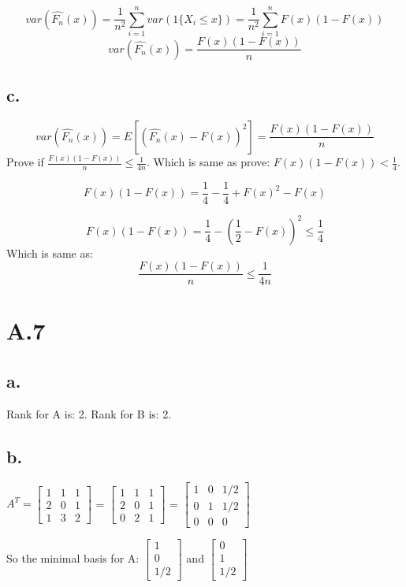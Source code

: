 \documentclass{article}
\begin{document}
\[var(\hat{F_n}(x))=\frac{1}{n^2}\sum_{i=1}^nvar(1\{X_i\le x\})=\frac{1}{n^2}\sum_{i=1}^nF(x)(1-F(x))\]
\[ var(\hat{F_n}(x))=\frac{F(x)(1-F(x))}{n}\]

\subsection{c.}

\[ var(\hat{F_n}(x))=E[(\hat{F_n}(x)-F(x))^2] =\frac{F(x)(1-F(x))}{n}\]
Prove if $\frac{F(x)(1-F(x))}{n}\le\frac{1}{4n}$.
Which is same as prove: $F(x)(1-F(x))<\frac{1}{4}$.\newline

\[ F(x)(1-F(x)) = \frac{1}{4}-\frac{1}{4}+F(x)^2-F(x) \]

\[ F(x)(1-F(x)) = \frac{1}{4}-(\frac{1}{2}-F(x))^2 \le \frac{1}{4}\]
Which is same as:
\[\frac{F(x)(1-F(x))}{n}\le\frac{1}{4n}\]



\section{A.7}
\subsection{a.}
Rank for A is: 2.\newline
Rank for B is: 2.
\subsection{b.}
$A^T=\begin{bmatrix}
1 & 1 & 1\\
2 & 0 & 1\\
1 & 3 & 2
\end{bmatrix}$
=
$\begin{bmatrix}
1 & 1 & 1\\
2 & 0 & 1\\
0 & 2 & 1
\end{bmatrix}$
=
$\begin{bmatrix}
1 & 0 & 1/2\\
0 & 1 & 1/2\\
0 & 0 & 0
\end{bmatrix}$ \newline


So the minimal basis for A: 
$\begin{bmatrix}
1\\ 
0\\
1/2
\end{bmatrix}$
and
$\begin{bmatrix}
0\\ 
1\\
1/2
\end{bmatrix}$ \newline
\end{document}
